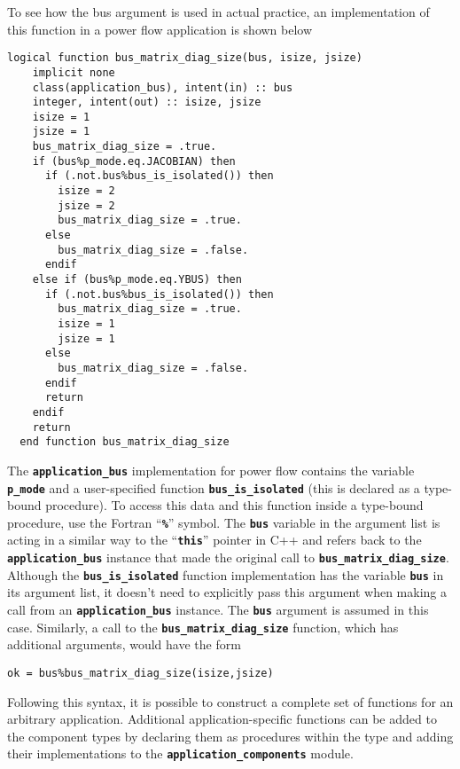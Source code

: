 To see how the bus argument is used in actual practice, an implementation of this function in a power flow application is shown below

{
\color{red}
\begin{Verbatim}[fontseries=b]
  logical function bus_matrix_diag_size(bus, isize, jsize)
    implicit none
    class(application_bus), intent(in) :: bus
    integer, intent(out) :: isize, jsize
    isize = 1
    jsize = 1
    bus_matrix_diag_size = .true.
    if (bus%p_mode.eq.JACOBIAN) then
      if (.not.bus%bus_is_isolated()) then
        isize = 2
        jsize = 2
        bus_matrix_diag_size = .true.
      else
        bus_matrix_diag_size = .false.
      endif
    else if (bus%p_mode.eq.YBUS) then
      if (.not.bus%bus_is_isolated()) then
        bus_matrix_diag_size = .true.
        isize = 1
        jsize = 1
      else
        bus_matrix_diag_size = .false.
      endif
      return
    endif
    return
  end function bus_matrix_diag_size
\end{Verbatim}
}

The \texttt{\textbf{application\_bus}} implementation for power flow contains the variable \texttt{\textbf{p\_mode}} and a user-specified function \texttt{\textbf{bus\_is\_isolated}} (this is declared as a type-bound procedure). To access this data and this function inside a type-bound procedure, use the Fortran ``\texttt{\textbf{\%}}'' symbol. The \texttt{\textbf{bus}} variable in the argument list is acting in a similar way to the ``\texttt{\textbf{this}}'' pointer in C++ and refers back to the \texttt{\textbf{application\_bus}} instance that made the original call to \texttt{\textbf{bus\_matrix\_diag\_size}}. Although the \texttt{\textbf{bus\_is\_isolated}} function implementation has the variable \texttt{\textbf{bus}} in its argument list, it doesn't need to explicitly pass this argument when making a call from an \texttt{\textbf{application\_bus}} instance. The \texttt{\textbf{bus}} argument is assumed in this case. Similarly, a call to the \texttt{\textbf{bus\_matrix\_diag\_size}} function, which has additional arguments, would have the form

{
\color{red}
\begin{Verbatim}[fontseries=b]
      ok = bus%bus_matrix_diag_size(isize,jsize)
\end{Verbatim}
}

Following this syntax, it is possible to construct a complete set of functions for an arbitrary application. Additional application-specific functions can be added to the component types by declaring them as procedures within the type and adding their implementations to the \texttt{\textbf{application\_components}} module.

